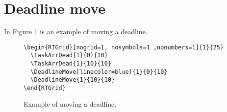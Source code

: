 \documentclass{article}
\begin{document}
\section{Deadline move}

In Figure \ref{fig:deadline-move} is an example of moving a deadline.

\begin{figure}
  \centering
  \begin{RTGrid}[nogrid=1, nosymbols=1 ,nonumbers=1]{1}{25}
  \end{RTGrid}
\begin{verbatim}
\begin{RTGrid}[nogrid=1, nosymbols=1 ,nonumbers=1]{1}{25}
  \TaskArrDead{1}{0}{10}
  \TaskArrDead{1}{10}{10}
  \DeadlineMove[linecolor=blue]{1}{0}{10}
  \DeadlineMove{1}{10}{10}
\end{RTGrid}
\end{verbatim}
  \caption{Example of moving a deadline.}
  \label{fig:deadline-move}
\end{figure}
\end{document}

